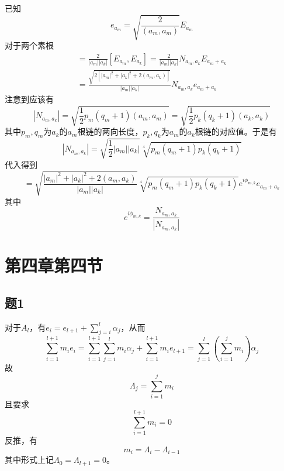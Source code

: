 \documentclass{ctexart}
\begin{document}
	已知
	\begin{equation}
	e_{a_m}=\sqrt{\frac{2}{(a_m,a_m)}}E_{a_m}
	\end{equation}
	对于两个素根
	\begin{multline}
	[e_{a_m},e_{a_k}]=\frac{2}{|a_m||a_k|}[E_{a_m},E_{a_k}]=\frac{2}{|a_m||a_k|}N_{a_m,a_k}E_{a_m+a_k}\\=\frac{\sqrt{2\left[|a_m|^2+|a_k|^2+2(a_m,a_k)\right]}}{|a_m||a_k|}N_{a_m,a_k}e_{a_m+a_k}
	\end{multline}
	注意到应该有
	\begin{equation}
	|N_{a_m,a_k}|=\sqrt{\frac{1}{2}p_m(q_m+1)(a_m,a_m)}=\sqrt{\frac{1}{2}p_k(q_k+1)(a_k,a_k)}
	\end{equation}
	其中$p_m,q_m$为$a_k$的$a_m$根链的两向长度，$p_k,q_k$为$a_m$的$a_k$根链的对应值。于是有
	\begin{equation}
	|N_{a_m,a_k}|=\sqrt{\frac{1}{2}|a_m||a_k|}\sqrt[4]{p_m(q_m+1)p_k(q_k+1)}
	\end{equation}
	代入得到
	\begin{equation}
	[e_{a_m},e_{a_k}]=\sqrt{\frac{|a_m|^2+|a_k|^2+2(a_m,a_k)}{|a_m||a_k|}}\sqrt[4]{p_m(q_m+1)p_k(q_k+1)}e^{i\phi_{m,k}}e_{a_m+a_k}
	\end{equation}
	其中
	\begin{equation}
	e^{i\phi_{m,k}}=\frac{N_{a_m,a_k}}{|N_{a_m,a_k}|}
	\end{equation}
	
	\section{第四章第四节}
	
	\subsection{题1}
	
	对于$A_l$，有$e_i=e_{l+1}+\sum_{j=i}^l\alpha_j$，从而
	\begin{equation}
	\sum_{i=1}^{l+1}m_ie_i=\sum_{i=1}^{l+1}\sum_{j=i}^lm_i\alpha_j+\sum_{i=1}^{l+1}m_ie_{l+1}=\sum_{j=1}^l\left(\sum_{i=1}^j m_i\right)\alpha_j
	\end{equation}
	故
	\begin{equation}
	\Lambda_j=\sum_{i=1}^j m_i
	\end{equation}
	且要求
	\begin{equation}
	\sum_{i=1}^{l+1}m_i=0
	\end{equation}
	反推，有
	\begin{equation}
	m_i=\Lambda_{i}-\Lambda_{i-1}
	\end{equation}
	其中形式上记$\Lambda_0=\Lambda_{l+1}=0$。
	
\end{document}
